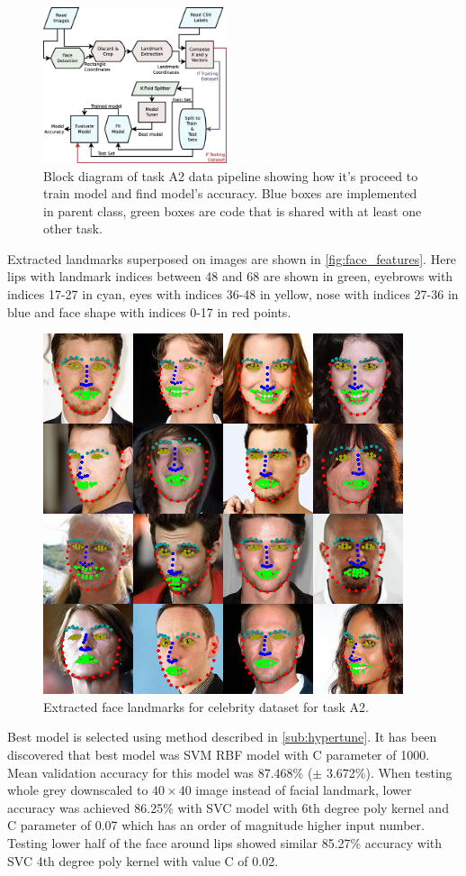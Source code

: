\documentclass{article}
\begin{document}
\begin{figure}[htb]
	\centering
	\includegraphics[width=0.48\textwidth]{graphics/A2_diagram.eps}
	\caption{Block diagram of task A2 data pipeline showing how it's proceed to train model and find model's accuracy. Blue boxes are implemented in parent class, green boxes are code that is shared with at least one other task.}
	\label{fig:block_a2}
\end{figure}

Extracted landmarks superposed on images are shown in \autoref{fig:face_features}. Here lips with landmark indices between 48 and 68 are shown in green, eyebrows with indices 17-27 in cyan, eyes with indices 36-48 in yellow, nose with indices 27-36 in blue and face shape with indices 0-17 in red points. 
\begin{figure}[htb]
	\centering
	\includegraphics[width=0.7\linewidth]{graphics/A2_landmarks.png}
	\caption{Extracted face landmarks for celebrity dataset for task A2.}
	\label{fig:face_features}	
\end{figure}

Best model is selected using method described in \autoref{sub:hypertune}. It has been discovered that best model was SVM RBF model with C parameter of 1000. Mean validation accuracy for this model was 87.468\% ($\pm$ 3.672\%). When testing whole grey downscaled to $40 \times 40$ image instead of facial landmark, lower accuracy was achieved 86.25\% with SVC model with 6th degree poly kernel and C parameter of 0.07 which has an order of magnitude higher input number. Testing lower half of the face around lips showed similar 85.27\% accuracy  with SVC 4th degree poly kernel with value C of 0.02.
\end{document}
